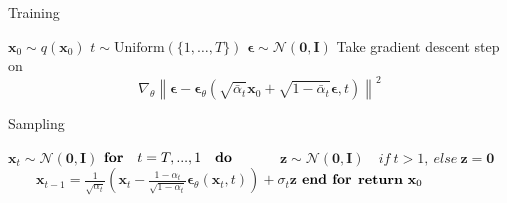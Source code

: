 \documentclass{article}
\begin{document}
    \begin{algorithm}[H]
    \caption{Training}
    \begin{algorithmic}[1]
        \REPEAT
            \STATE $ \mathbf{x}_0 \sim q(\mathbf{x}_0) $
            \STATE $ t \sim \text{Uniform}(\{1, \dots, T\}) $
            \STATE $ \boldsymbol{\epsilon} \sim \mathcal{N}(\mathbf{0}, \mathbf{I}) $
            \STATE Take gradient descent step on
            \[
            \nabla_{\theta} \left\| \boldsymbol{\epsilon} - \boldsymbol{\epsilon}_{\theta} \left( \sqrt{\bar{\alpha}_t} \mathbf{x}_0 + \sqrt{1 - \bar{\alpha}_t} \boldsymbol{\epsilon}, t \right) \right\|^2
            \]
    \end{algorithmic}
    \end{algorithm}

    \begin{algorithm}[H]
    \caption{Sampling}
    \begin{algorithmic}[1]
        \STATE $ \mathbf{x}_t \sim \mathcal{N}(\mathbf{0}, \mathbf{I}) $
        \STATE $ \text{\textbf{for}}  \quad  t=T, ..., 1 \quad  \text{\textbf{do}} \quad  $
        \STATE $ \qquad \mathbf{z} \sim \mathcal{N}(\mathbf{0}, \mathbf{I}) \quad if \  t > 1, \  else \  \mathbf{z}=\mathbf{0} $
        \STATE $ \qquad \mathbf{x}_{t-1} = \frac{1}{\sqrt{\alpha_t}} \left( \mathbf{x}_t - \frac{1-\alpha_t}{\sqrt{1-\alpha_t}} \bm{\epsilon}_\theta(\mathbf{x}_t, t) \right) + \sigma_t\mathbf{z} $
        \STATE $ \text{\textbf{end for}} $
        \STATE $ \text{\textbf{return}} \  \mathbf{x}_0 $
    \end{algorithmic}
    \end{algorithm}
\end{document}

